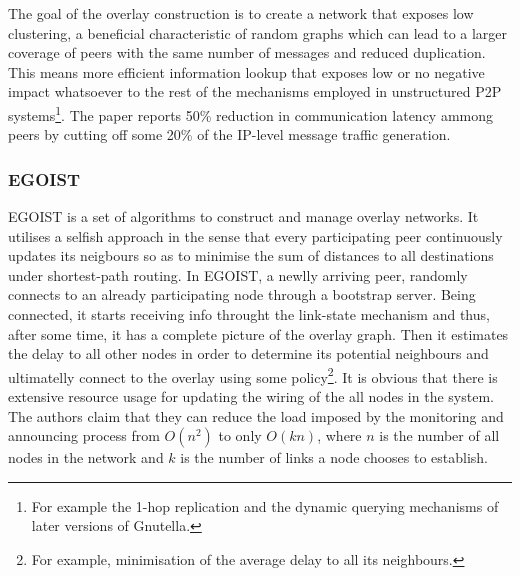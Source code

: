 The goal of the overlay construction is to create a network that exposes low
clustering, a beneficial characteristic of random graphs which can lead to a
larger coverage of peers with the same number of messages and reduced
duplication. This means more efficient information lookup that exposes low or no
negative impact whatsoever to the rest of the mechanisms employed in
unstructured P2P systems\footnote{For example the 1-hop replication and the
dynamic querying mechanisms of later versions of Gnutella.}. The paper reports
50\% reduction in communication latency ammong peers by cutting off some 20\% of
the IP-level message traffic generation.

\subsubsection{EGOIST}
EGOIST \cite{egoist_2008} is a set of algorithms to construct and manage overlay
networks. It utilises a selfish approach in the sense that every participating
peer continuously updates its neigbours so as to minimise the sum of distances
to all destinations under shortest-path routing. In EGOIST, a newlly arriving
peer, randomly connects to an already participating node through a bootstrap
server. Being connected, it starts receiving info throught the link-state
mechanism and thus, after some time, it has a complete picture of the overlay
graph. Then it estimates the delay to all other nodes in order to determine its
potential neighbours and ultimatelly connect to the overlay using some
policy\footnote{For example, minimisation of the average delay to all its
neighbours.}. It is obvious that there is extensive resource usage for updating
the wiring of the all nodes in the system. The authors claim that they can
reduce the load imposed by the monitoring and announcing process from $O(n^2)$
to only $O(kn)$, where $n$ is the number of all nodes in the network and $k$ is
the number of links a node chooses to establish.

